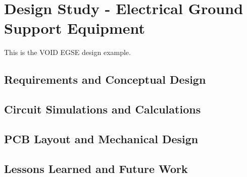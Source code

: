 \chapter{Design Study - Electrical Ground Support Equipment}\label{CH:Design3}
This is the VOID EGSE design example.

\section{Requirements and Conceptual Design}\label{Sect:test}



\section{Circuit Simulations and Calculations}\label{Sect:test}



\section{PCB Layout and Mechanical Design}\label{Sect:test}



\section{Lessons Learned and Future Work}\label{Sect:test}